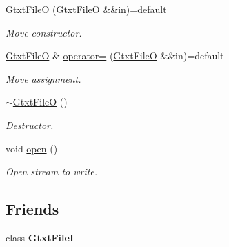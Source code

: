 \begin{DoxyCompactItemize}
\mbox{\label{classsamp_files_1_1_gtxt_file_o_a3173192f42a6c9800f329c502e52906b}} 
\hyperlink{classsamp_files_1_1_gtxt_file_o_a3173192f42a6c9800f329c502e52906b}{Gtxt\+FileO} (\hyperlink{classsamp_files_1_1_gtxt_file_o}{Gtxt\+FileO} \&\&in)=default
\begin{DoxyCompactList}\small\item\em Move constructor. \end{DoxyCompactList}\item 
\mbox{\label{classsamp_files_1_1_gtxt_file_o_a610a322b89fc0b7dd807eaed922fdaa4}} 
\hyperlink{classsamp_files_1_1_gtxt_file_o}{Gtxt\+FileO} \& \hyperlink{classsamp_files_1_1_gtxt_file_o_a610a322b89fc0b7dd807eaed922fdaa4}{operator=} (\hyperlink{classsamp_files_1_1_gtxt_file_o}{Gtxt\+FileO} \&\&in)=default
\begin{DoxyCompactList}\small\item\em Move assignment. \end{DoxyCompactList}\item 
\mbox{\label{classsamp_files_1_1_gtxt_file_o_a3cfd3dc27a9026aeda69ab16ec5d5883}} 
\hyperlink{classsamp_files_1_1_gtxt_file_o_a3cfd3dc27a9026aeda69ab16ec5d5883}{$\sim$\+Gtxt\+FileO} ()
\begin{DoxyCompactList}\small\item\em Destructor. \end{DoxyCompactList}\item 
\mbox{\label{classsamp_files_1_1_gtxt_file_o_a0659134a8ea9f344b5d4e3eb5b7b2452}} 
void \hyperlink{classsamp_files_1_1_gtxt_file_o_a0659134a8ea9f344b5d4e3eb5b7b2452}{open} ()
\begin{DoxyCompactList}\small\item\em Open stream to write. \end{DoxyCompactList}\end{DoxyCompactItemize}
\subsection*{Friends}
\begin{DoxyCompactItemize}
\item 
\mbox{\label{classsamp_files_1_1_gtxt_file_o_a7932dd6919f418cd1d8e5b398bbc72bf}} 
class {\bfseries Gtxt\+FileI}
\end{DoxyCompactItemize}
